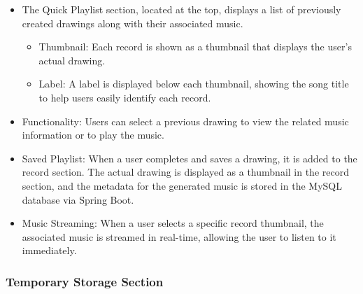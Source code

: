 \documentclass[conference]{IEEEtran}
\begin{document}
\begin{itemize}
    \item The Quick Playlist section, located at the top, displays a list of previously created drawings along with their associated music.
\begin{itemize}
    \item Thumbnail: Each record is shown as a thumbnail that displays the user’s actual drawing.\\
    \item Label: A label is displayed below each thumbnail, showing the song title to help users easily identify each record.\\
\end{itemize}
    \item Functionality: Users can select a previous drawing to view the related music information or to play the music.\\
    \item Saved Playlist: When a user completes and saves a drawing, it is added to the record section. The actual drawing is displayed as a thumbnail in the record section, and the metadata for the generated music is stored in the MySQL database via Spring Boot.\\
    \item Music Streaming: When a user selects a specific record thumbnail, the associated music is streamed in real-time, allowing the user to listen to it immediately.\\
\end{itemize}

\subsubsection{Temporary Storage Section}
\end{document}
